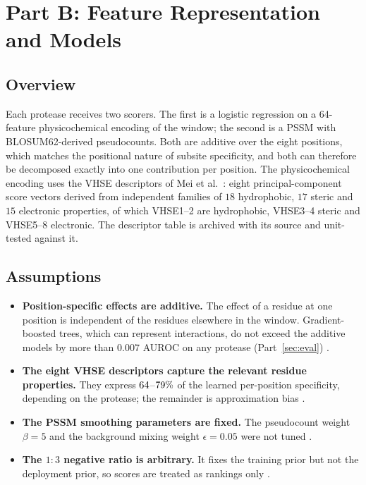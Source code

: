 \section{Part B: Feature Representation and Models}
\label{sec:models}

\subsection{Overview}

Each protease receives two scorers. The first is a logistic regression on a
64-feature physicochemical encoding of the window; the second is a PSSM with
BLOSUM62-derived pseudocounts. Both are additive over the eight positions,
which matches the positional nature of subsite specificity, and both can
therefore be decomposed exactly into one contribution per position. The
physicochemical encoding uses the VHSE descriptors of Mei et al.\ :
eight principal-component score vectors derived from independent families of
$18$ hydrophobic, $17$ steric and $15$ electronic properties, of which
VHSE1--2 are hydrophobic, VHSE3--4 steric and VHSE5--8 electronic. The
descriptor table is archived with its source and unit-tested against it.

\subsection{Assumptions}

\begin{assump}
\begin{itemize}[leftmargin=*,noitemsep]
\item \textbf{Position-specific effects are additive.} The effect of a residue
  at one position is independent of the residues elsewhere in the window.
  Gradient-boosted trees, which can represent interactions, do not exceed the
  additive models by more than $0.007$ AUROC on any protease (Part~\ref{sec:eval})
  \CONF.
\item \textbf{The eight VHSE descriptors capture the relevant residue
  properties.} They express $64$--$79\%$ of the learned
  per-position specificity, depending on the protease; the remainder is
  approximation bias \CONF.
\item \textbf{The PSSM smoothing parameters are fixed.} The pseudocount weight
  $\beta=5$ and the background mixing weight $\epsilon=0.05$ were not tuned
  \FLAG.
\item \textbf{The $1{:}3$ negative ratio is arbitrary.} It fixes the training
  prior but not the deployment prior, so scores are treated as rankings only
  \CONF.
\end{itemize}
\end{assump}


